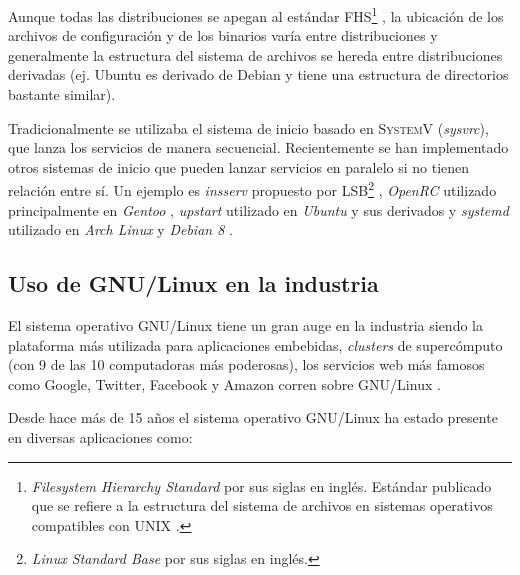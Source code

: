 Aunque todas las distribuciones se apegan al est\'{a}ndar \textsc{FHS}\footnote{\textit{Filesystem Hierarchy Standard} por sus siglas en ingl\'{e}s. Est\'{a}ndar publicado que se refiere a la estructura del sistema de archivos en sistemas operativos compatibles con \textsc{UNIX} \cite{_fhs_????}.} \cite{_filesystem_????}, la ubicaci\'{o}n de los archivos de configuraci\'{o}n y de los binarios var\'{i}a entre distribuciones y generalmente la estructura del sistema de archivos se hereda entre distribuciones derivadas (ej. Ubuntu es derivado de Debian y tiene una estructura de directorios bastante similar).

Tradicionalmente se utilizaba el sistema de inicio basado en \textsc{SystemV} (\textit{sysvrc}), que lanza los servicios de manera secuencial. Recientemente se han implementado otros sistemas de inicio que pueden lanzar servicios en paralelo si no tienen relaci\'{o}n entre s\'{i}. Un ejemplo es \textit{insserv} propuesto por \textsc{LSB}\footnote{\textit{Linux Standard Base} por sus siglas en ingl\'{e}s.} \cite{_lsbinitscripts_????} \cite{_lsbinitscripts/dependencybasedboot_????}, \textit{OpenRC} utilizado principalmente en \textit{Gentoo} \cite{_gentoo_????}\cite{_openrc_????}\cite{_openrc_????-1}, \textit{upstart} utilizado en \textit{Ubuntu} y sus derivados \cite{_upstart_????} y \textit{systemd} utilizado en \textit{Arch Linux} y \textit{Debian 8} \cite{_systemd_????}.


  \subsection {Uso de GNU/Linux en la industria}

El sistema operativo GNU/Linux tiene un gran auge en la industria siendo la plataforma m\'{a}s utilizada para aplicaciones embebidas, \textit{clusters} de superc\'{o}mputo (con 9 de las 10 computadoras m\'{a}s poderosas), los servicios web m\'{a}s famosos como Google, Twitter, Facebook y Amazon corren sobre GNU/Linux \cite{_how_????}.
\newpage

Desde hace m\'{a}s de 15 a\~{n}os el sistema operativo \textsc{GNU}/Linux ha estado presente en diversas aplicaciones como:

